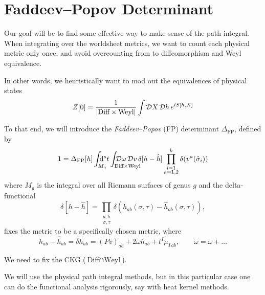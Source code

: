 
\section{Faddeev--Popov Determinant}%
\label{sec:faddeev_popov_determinant}

Our goal will be to find some effective way to make sense of the path integral. When integrating over the worldsheet metrics, we want to count each physical metric only once, and avoid overcounting from to diffeomorphism and Weyl equivalence.

In other words, we heuristically want to mod out the equivalences of physical states
\begin{equation}
  \label{eq:9-1}
  Z[0] = \frac{1}{\abs{\text{Diff} \times \text{Weyl}}} \int \mathop{\mathcal{D} X} \mathop{\mathcal{D} h} e^{i S[h, X]}
\end{equation}
\begin{definition}
  To that end, we will introduce the \emph{Faddeev--Popov} (FP) determinant $\Delta_{\text{FP}}$, defined by
  \begin{equation}
    \label{eq:9-2}
    1 = \Delta_{\text{FP}}[h] \int_{\mathrlap{M_g}} \dd[s]{t} \int_{\mathrlap{\text{Diff} \times \text{Weyl}}} \pdd{\omega} \pdd{v} \delta[h - \hat{h}] \prod_{\substack{i = 1 \\ a = 1, 2}}^k \delta(v^a (\hat{\sigma}_i))
  \end{equation}
  where $M_g$ is the integral over all Riemann surfaces of genus $g$ and the delta-functional
  \begin{equation}
    \delta[h - \hat{h}] = \prod_{\substack{a, b\\ \sigma, \tau}} \delta(h_{ab}(\sigma, \tau) - \hat{h}_{ab}(\sigma, \tau)),
  \end{equation}
  fixes the metric to be a specifically chosen metric, where
  \begin{equation}
    h_{ab} - \hat{h}_{ab} = \delta h_{ab} = (Pv)_{ab} + 2 \overline{\omega}{} h_{ab} + t^I \mu_{I\,ab}, \qquad \overline{\omega}{} = \omega + \dots
  \end{equation}
\end{definition}
We need to fix the CKG ($\text{Diff} \cap \text{Weyl}$).

\begin{leftbar}
  We will use the physical path integral methods, but in this particular case one can do the functional analysis rigorously, say with heat kernel methods.
\end{leftbar}

